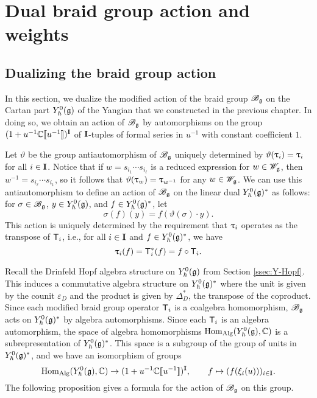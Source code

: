 \chapter{Dual braid group action and weights}

\section{Dualizing the braid group action}

In this section, we dualize the modified action of the braid group $\Bg$ on the Cartan part $\Yhg[0]$ of the Yangian that we constructed in the previous chapter.
In doing so, we obtain an action of $\Bg$ by automorphisms on the group $(1+u^{-1}\C\db{u^{-1}})^\I$ of $\I$-tuples of formal series in $u^{-1}$ with constant coefficient $1$.

Let $\vartheta$ be the group antiautomorphism of $\Bg$ uniquely determined by $\vartheta(\braid_i)=\braid_i$ for all $i\in\I$.
Notice that if $w = s_{i_1}\cdots s_{i_\ell}$ is a reduced expression for $w\in\Wg$, then $w^{-1} = s_{i_\ell}\cdots s_{i_1}$, so it follows that $\vartheta(\braid_w)=\braid_{w^{-1}}$ for any $w\in\Wg$.
We can use this antiautomorphism to define an action of $\Bg$ on the linear dual $\Yhg[0]^*$ as follows: for $\sigma\in\Bg$, $y\in\Yhg[0]$, and $f\in\Yhg[0]^*$, let
\[\sigma(f)(y) = f(\vartheta(\sigma)\cdot y).\]
This action is uniquely determined by the requirement that $\braid_i$ operates as the transpose of $\mbraid_i$, i.e., for all $i\in\I$ and $f\in\Yhg[0]^*$, we have
\[\braid_i(f) = \mbraid_i^*(f) = f\circ\mbraid_i.\]

Recall the Drinfeld Hopf algebra structure on $\Yhg[0]$ from Section \ref{ssec:Y-Hopf}.
This induces a commutative algebra structure on $\Yhg[0]^*$ where the unit is given by the counit $\varepsilon_D$ and the product is given by $\Delta_D^*$, the transpose of the coproduct.
Since each modified braid group operator $\mbraid_i$ is a coalgebra homomorphism, $\Bg$ acts on $\Yhg[0]^*$ by algebra automorphisms.
Since each $\mbraid_i$ is an algebra automorphism, the space of algebra homomorphisms $\Hom_{\text{Alg}}(\Yhg[0],\C)$ is a subrepresentation of $\Yhg[0]^*$.
This space is a subgroup of the group of units in $\Yhg[0]^*$, and we have an isomorphism of groups
\[\Hom_{\text{Alg}}(\Yhg[0],\C)\to(1+u^{-1}\C\db{u^{-1}})^\I, \qquad f\mapsto(f(\xi_i(u)))_{i\in\I}.\]
The following proposition gives a formula for the action of $\Bg$ on this group.

